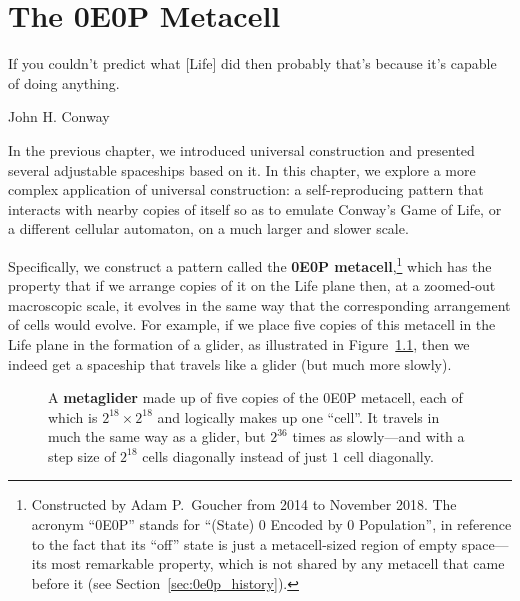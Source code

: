 
\renewcommand{\chapterfolder}{0e0p/}
\chapter{The 0E0P Metacell}\label{chp:0e0p}


\vspace*{-0.4in}
\epigraph{If you couldn't predict what [Life] did then probably that's because it's capable of doing anything.}{John H. Conway}
\vspace*{0.15in}


\noindent In the previous chapter, we introduced universal construction and presented several adjustable spaceships based on it. In this chapter, we explore a more complex application of universal construction: a self-reproducing pattern that interacts with nearby copies of itself so as to emulate Conway's Game of Life, or a different cellular automaton, on a much larger and slower scale.

Specifically, we construct a pattern called the \textbf{0E0P metacell},\footnote{Constructed by Adam P.~Goucher from 2014 to November 2018. The acronym ``0E0P'' stands for ``(State) 0 Encoded by 0 Population'', in reference to the fact that its ``off'' state is just a metacell-sized region of empty space---its most remarkable property, which is not shared by any metacell that came before it (see Section~\ref{sec:0e0p_history}).} which has the property that if we arrange copies of it on the Life plane then, at a zoomed-out macroscopic scale, it evolves in the same way that the corresponding arrangement of cells would evolve. For example, if we place five copies of this metacell in the Life plane in the formation of a glider, as illustrated in Figure~\ref{fig:0e0p_glider}, then we indeed get a spaceship that travels like a glider (but much more slowly).

\begin{figure}[!htb]
	\centering
	\caption{A \textbf{metaglider} made up of five copies of the 0E0P metacell, each of which is $2^{18} \times 2^{18}$ and logically makes up one ``cell''. It travels in much the same way as a glider, but $2^{36}$ times as slowly---and with a step size of $2^{18}$ cells diagonally instead of just $1$ cell diagonally.}\label{fig:0e0p_glider}
\end{figure}

